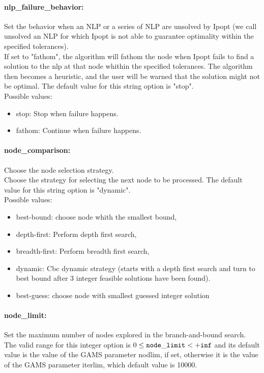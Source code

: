 \paragraph{nlp\_failure\_behavior:} Set the behavior when an NLP or a series of NLP are unsolved by Ipopt (we call unsolved an NLP for which Ipopt is not able to guarantee optimality within the specified tolerances). $\;$ \\
 If set to "fathom", the algorithm will fathom the
node when Ipopt fails to find a solution to the
nlp at that node whithin the specified
tolerances. The algorithm then becomes a
heuristic, and the user will be warned that the
solution might not be optimal.
The default value for this string option is "stop".
\\ 
Possible values:
\begin{itemize}
   \item stop: Stop when failure happens.
   \item fathom: Continue when failure happens.
\end{itemize}

\paragraph{node\_comparison:} Choose the node selection strategy. $\;$ \\
 Choose the strategy for selecting the next node
to be processed.
The default value for this string option is "dynamic".
\\ 
Possible values:
\begin{itemize}
   \item best-bound: choose node whith the smallest bound,
   \item depth-first: Perform depth first search,
   \item breadth-first: Perform breadth first search,
   \item dynamic: Cbc dynamic strategy (starts with a depth first
search and turn to best bound after 3 integer
feasible solutions have been found).
   \item best-guess: choose node with smallest guessed integer
solution
\end{itemize}

\paragraph{node\_limit:} Set the maximum number of nodes explored in the branch-and-bound search. $\;$ \\
 The valid range for this integer option is
$0 \le {\tt node\_limit } <  {\tt +inf}$
and its default value is the value of the GAMS parameter nodlim, if set, otherwise it is the value of the GAMS parameter iterlim, which default value is 10000.


